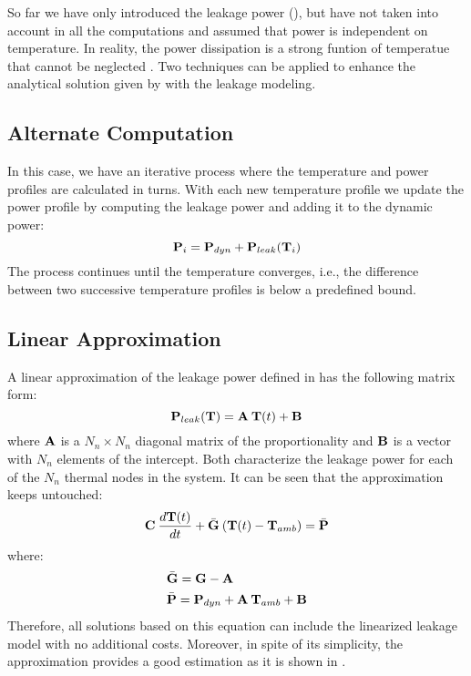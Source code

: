 So far we have only introduced the leakage power (), but have not taken into account in all the computations and assumed that power is independent on temperature. In reality, the power dissipation is a strong funtion of temperatue that cannot be neglected \cite{liu2007}. Two techniques can be applied to enhance the analytical solution given by  with the leakage modeling.

\subsection{Alternate Computation}
In this case, we have an iterative process where the temperature and power profiles are calculated in turns. With each new temperature profile we update the power profile by computing the leakage power and adding it to the dynamic power:
\[
  \mathbf{P}_i = \mathbf{P}_{dyn} + \mathbf{P}_{leak}(\mathbf{T}_i)
\]
The process continues until the temperature converges, i.e., the difference between two successive temperature profiles is below a predefined bound.

\subsection{Linear Approximation}
A linear approximation of the leakage power defined in  has the following matrix form:
\[
  \mathbf{P}_{leak}(\mathbf{T}) = \mathbf{A} \: \mathbf{T}(t) + \mathbf{B}
\]
where $\mathbf{A}$ is a $N_n \times N_n$ diagonal matrix of the proportionality and $\mathbf{B}$ is a vector with $N_n$ elements of the intercept. Both characterize the leakage power for each of the $N_n$ thermal nodes in the system. It can be seen that the approximation keeps  untouched:
\[
  \mathbf{C} \: \frac{d\mathbf{T}(t)}{dt} + \bar{\mathbf{G}} \: (\mathbf{T}(t) - \mathbf{T}_{amb}) = \bar{\mathbf{P}}
\]
where:
\begin{align*}
  & \bar{\mathbf{G}} = \mathbf{G} - \mathbf{A} \\
  & \bar{\mathbf{P}} = \mathbf{P}_{dyn} + \mathbf{A} \: \mathbf{T}_{amb} + \mathbf{B}
\end{align*}
Therefore, all solutions based on this equation can include the linearized leakage model with no additional costs. Moreover, in spite of its simplicity, the approximation provides a good estimation as it is shown in \cite{liu2007}.
